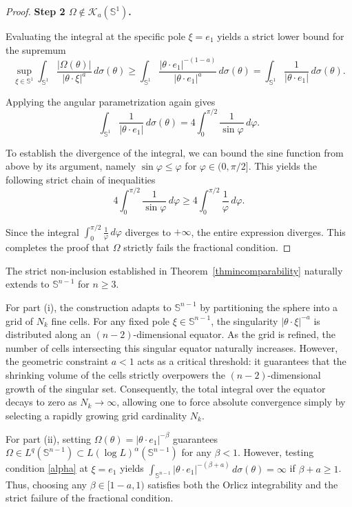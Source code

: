\documentclass[11pt]{amsart}
\begin{document}
\begin{proof}
	\noindent\textbf{Step 2 $\Omega\notin \mathcal K_a(\mathbb{S}^1)$.}
	
	Evaluating the integral at the specific pole $\xi = e_1$ yields a strict lower bound for the supremum
	$$\sup_{\xi \in \mathbb{S}^1} \int_{\mathbb{S}^1} \frac{|\Omega(\theta)|}{|\theta \cdot \xi|^a} \, d\sigma(\theta) \ge \int_{\mathbb{S}^1} \frac{|\theta \cdot e_1|^{-(1-a)}}{|\theta \cdot e_1|^a} \, d\sigma(\theta) = \int_{\mathbb{S}^1} \frac{1}{|\theta \cdot e_1|} \, d\sigma(\theta).$$
	
	Applying the angular parametrization again gives
	$$\int_{\mathbb{S}^1} \frac{1}{|\theta \cdot e_1|} \, d\sigma(\theta) = 4 \int_0^{\pi/2} \frac{1}{\sin \varphi} \, d\varphi.$$
	
	To establish the divergence of the integral, we can bound the sine function from above by its argument, namely $\sin \varphi \le \varphi$ for $\varphi \in (0, \pi/2]$. This yields the following strict chain of inequalities
	$$4 \int_0^{\pi/2} \frac{1}{\sin \varphi} \, d\varphi \ge 4 \int_0^{\pi/2} \frac{1}{\varphi} \, d\varphi.$$
	
	Since the integral $\int_0^{\pi/2} \frac{1}{\varphi} \, d\varphi$ diverges to $+\infty$, the entire expression diverges. This completes the proof that $\Omega$ strictly fails the fractional condition.	
\end{proof}

\begin{remark}\label{rem_higher_dim}
	The strict non-inclusion established in Theorem~\ref{thmincomparability} naturally extends to $\mathbb{S}^{n-1}$ for $n \ge 3$.
	
	For part (i), the construction adapts to $\mathbb{S}^{n-1}$ by partitioning the sphere into a grid of $N_k$ fine cells. For any fixed pole $\xi \in \mathbb{S}^{n-1}$, the singularity $|\theta \cdot \xi|^{-a}$ is distributed along an $(n-2)$-dimensional equator. As the grid is refined, the number of cells intersecting this singular equator naturally increases. However, the geometric constraint $a < 1$ acts as a critical threshold: it guarantees that the shrinking volume of the cells strictly overpowers the $(n-2)$-dimensional growth of the singular set. Consequently, the total integral over the equator decays to zero as $N_k \to \infty$, allowing one to force absolute convergence simply by selecting a rapidly growing grid cardinality $N_k$.
	
	For part (ii), setting $\Omega(\theta) = |\theta \cdot e_1|^{-\beta}$ guarantees $\Omega \in L^q(\mathbb{S}^{n-1}) \subset L(\log L)^\alpha(\mathbb{S}^{n-1})$ for any $\beta < 1$. However, testing condition \eqref{alpha} at $\xi = e_1$ yields $\int_{\mathbb{S}^{n-1}} |\theta \cdot e_1|^{-(\beta+a)} \, d\sigma(\theta) = \infty$ if $\beta + a \ge 1$. Thus, choosing any $\beta \in [1-a, 1)$ satisfies both the Orlicz integrability and the strict failure of the fractional condition.
\end{remark}
\end{document}
